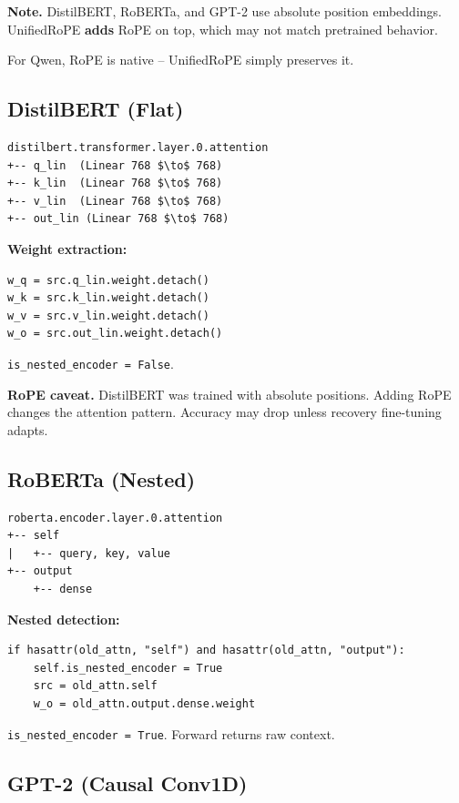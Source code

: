{\textbf{Note.} DistilBERT, RoBERTa, and GPT-2 use absolute position embeddings. 
UnifiedRoPE \textbf{adds} RoPE on top, which may not match pretrained behavior.

For Qwen, RoPE is native -- UnifiedRoPE simply preserves it.

\subsection{DistilBERT (Flat)}

\begin{lstlisting}
distilbert.transformer.layer.0.attention
+-- q_lin  (Linear 768 $\to$ 768)
+-- k_lin  (Linear 768 $\to$ 768)
+-- v_lin  (Linear 768 $\to$ 768)
+-- out_lin (Linear 768 $\to$ 768)
\end{lstlisting}

\textbf{Weight extraction:}
\begin{lstlisting}
w_q = src.q_lin.weight.detach()
w_k = src.k_lin.weight.detach()
w_v = src.v_lin.weight.detach()
w_o = src.out_lin.weight.detach()
\end{lstlisting}

\texttt{is\_nested\_encoder = False}.

\textbf{RoPE caveat.} DistilBERT was trained with absolute positions. Adding 
RoPE changes the attention pattern. Accuracy may drop unless recovery 
fine-tuning adapts.

\subsection{RoBERTa (Nested)}

\begin{lstlisting}
roberta.encoder.layer.0.attention
+-- self
|   +-- query, key, value
+-- output
    +-- dense
\end{lstlisting}

\textbf{Nested detection:}
\begin{lstlisting}
if hasattr(old_attn, "self") and hasattr(old_attn, "output"):
    self.is_nested_encoder = True
    src = old_attn.self
    w_o = old_attn.output.dense.weight
\end{lstlisting}

\texttt{is\_nested\_encoder = True}. Forward returns raw context.

\subsection{GPT-2 (Causal Conv1D)}

}
